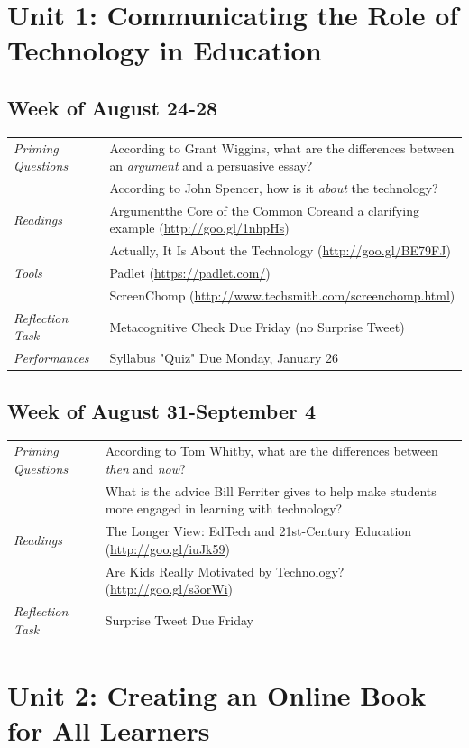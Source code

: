 \documentclass{tufte-handout}
\newcommand{\tabpq}{\faQuestionSign\medspace\textit{Priming Questions}}
\newcommand{\tabread}{\faBook\medspace\textit{Readings}}
\newcommand{\tabtools}{\faWrench\medspace\textit{Tools}}
\newcommand{\tabtweet}{\faLightbulb\medspace\textit{Reflection Task} & Surprise Tweet Due Friday \\}
\newcommand{\tabcheck}{\faLightbulb\medspace\textit{Reflection Task} & Metacognitive Check Due Friday (no Surprise Tweet) \\}
\newcommand{\tabperformance}{\faTasks\medspace\textit{Performances}}
\newenvironment{tabsched}
	{\small
	\begin{tabular}{p{1.5in}p{4.5in}}
	\toprule}
	{\bottomrule
	\end{tabular}
	\normalsize}
\newcommand{\weektwo}{August 24-28}
\newcommand{\weekthree}{August 31-September 4}
\begin{document}
\section{Unit 1: Communicating the Role of Technology in Education}

\subsection{Week of \weektwo}

\begin{tabsched}
	\tabpq & According to Grant Wiggins, what are the differences between an \emph{argument} and a persuasive essay? \\
	& According to John Spencer, how is it \emph{about} the technology? \\
	\midrule
	\tabread & Argument\textemdash{}the Core of the Common Core\textemdash{}and a clarifying example (\url{http://goo.gl/1nhpHs}) \\
	& Actually, It Is About the Technology (\url{http://goo.gl/BE79FJ}) \\
	\midrule
	\tabtools & Padlet (\url{https://padlet.com/}) \\
	& ScreenChomp (\url{http://www.techsmith.com/screenchomp.html}) \\
	\midrule
	\tabcheck
	\midrule
	\tabperformance & Syllabus "Quiz" Due Monday, January 26 \\
\end{tabsched}

\subsection{Week of \weekthree}

\begin{tabsched}
	\tabpq & According to Tom Whitby, what are the differences between \textit{then} and \textit{now}? \\
	& What is the advice Bill Ferriter gives to help make students more engaged in learning with technology? \\
	\midrule
	\tabread & The Longer View: EdTech and 21st-Century Education (\url{http://goo.gl/iuJk59}) \\
	& Are Kids Really Motivated by Technology? (\url{http://goo.gl/s3orWi}) \\
	\midrule
	\tabtweet
\end{tabsched}

\section{Unit 2: Creating an Online Book for All Learners}
\end{document}
